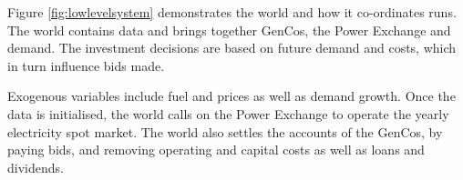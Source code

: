 Figure \ref{fig:lowlevelsystem} demonstrates the world and how it co-ordinates runs. The world contains data and brings together GenCos, the Power Exchange and demand. The investment decisions are based on future demand and costs, which in turn influence bids made.

Exogenous variables include fuel and  prices as well as demand growth. Once the data is initialised, the world calls on the Power Exchange to operate the yearly electricity spot market. The world also settles the accounts of the GenCos, by paying bids, and removing operating and capital costs as well as loans and dividends.















